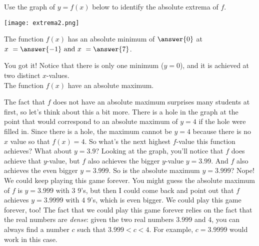 \documentclass{ximera}
\begin{document}
\begin{exercise}
Use the graph of $y = f(x)$ below to identify the absolute extrema of $f$.

\begin{center} \texttt{[image: extrema2.png]} \end{center}

The function $f(x)$ has an absolute minimum of $\answer{0}$ at $x \ = \answer{-1} \text{ and } x \ = \answer{7}$.  

\begin{exercise}
You got it!  Notice that there is only one minimum ($y=0$), and it is achieved at two distinct $x$-values.  \\

The function $f(x)$  have an absolute maximum.  

\begin{explanation}
The fact that $f$ does not have an absolute maximum surprises many students at first, so let's think about this a bit more.  There is a hole in the graph at the point that would correspond to an absolute maximum of $y=4$ if the hole were filled in.  Since there is a hole, the maximum cannot be $y=4$ because there is no $x$ value so that $f(x) = 4$.  So what's the next highest $f$-value this function achieves?  What about $y=3.9$?  Looking at the graph, you'll notice that $f$ does achieve that $y$-value, but $f$ also achieves the bigger $y$-value $y=3.99$.  And $f$ also achieves the even bigger $y=3.999$.  So is the absolute maximum $y=3.999$?  Nope!  We could keep playing this game forever.  You might guess the absolute maximum of $f$ is $y=3.999$ with $3$ $9$'s, but then I could come back and point out that $f$ achieves $y=3.9999$ with $4$ $9$'s, which is even bigger.  We could play this game forever, too!  The fact that we could play this game forever relies on the fact that the real numbers are \textit{dense}: given the two real numbers $3.999$ and $4$, you can always find a number $c$ such that $3.999 < c < 4$.  For example, $c = 3.9999$ would work in this case.  
\end{explanation}


\end{exercise}
\end{exercise}
 
\end{document}
